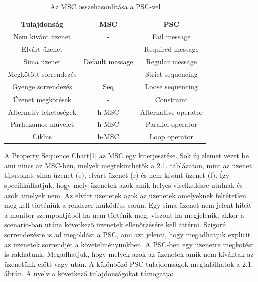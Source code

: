 \begin{table}[ht]
    \centering %
    \begin{tabular}{ |c|c|c| } %
    \hline
    \textbf{Tulajdonság} & \textbf{MSC} & \textbf{PSC} \\ [0.5ex] %
    \hline %
    \hline
    Nem kivánt üzenet & - & Fail message \\ %
    \hline
    Elvárt üzenet & - & Required message \\
    \hline
    Sima üzenet & Default message & Regular message \\
    \hline
    Megkötött sorrendezés & - & Strict sequencing \\
    \hline
    Gyenge sorrendezés & Seq & Loose sequencing \\
    \hline
    Üzenet megkötések & - & Constraint \\
    \hline
    Alternatív lehetőségek & h-MSC & Alternative operator \\
    \hline
    Párhuzamos művelet & h-MSC & Parallel operator \\
    \hline
    Ciklus & h-MSC & Loop operator \\
    \hline %
    \end{tabular}
    \label{table:nonlin} %
    \caption{Az MSC összehasonlítása a PSC-vel} %
\end{table}

A Property Sequence Chart[1] az MSC egy kiterjesztése.
Sok új elemet vezet be ami nincs az MSC-ben, melyek megtekinthetők a 2.1. táblázaton, mint az üzenet típusokat: sima üzenet (e), elvárt üzenet (r) és nem kívánt üzenet (f).
Így specifikálhatjuk, hogy mely üzenetek azok amik helyes viselkedésre utalnak és azok amelyek nem.
Az elvárt üzenetek azok az üzenetek amelyeknek feltétetlen meg kell történiük a rendszer működése során.
Egy sima üzenet nem jelent hibát a monitor szempontjából ha nem történik meg, viszont ha megjelenik, akkor a scenario-ban utána következő üzenetek ellenőrzésére kell áttérni.
Szigorú sorrendezésre is ad megoldást a PSC, ami azt jelenti, hogy megadhatjuk explicit az üzenetek sorrendjét a követelményünkben.
A PSC-ben egy üzenetre megkötést is rakhatunk.
Megadhatjuk, hogy melyek azok az üzenetek amik nem kívántak az üzenetünk előtt vagy után.
A különböző PSC tulajdonságok megtalálhatok a 2.1. ábrán.
A nyelv a következő tulajdonságokat támogatja:

